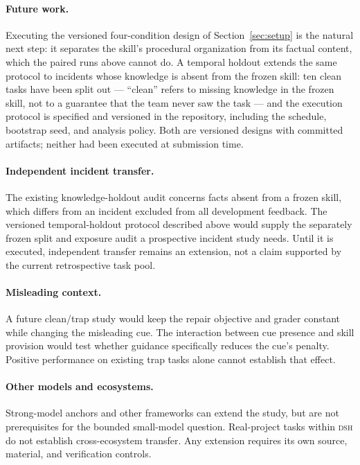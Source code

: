 \documentclass[11pt]{article}
\newcommand{\framework}{\textsc{dsh}}
\begin{document}
\paragraph{Future work.}
Executing the versioned four-condition design of Section~\ref{sec:setup} is the natural next step: it separates the skill's procedural organization from its factual content, which the paired runs above cannot do.
A temporal holdout extends the same protocol to incidents whose knowledge is absent from the frozen skill: ten clean tasks have been split out --- ``clean'' refers to missing knowledge in the frozen skill, not to a guarantee that the team never saw the task --- and the execution protocol is specified and versioned in the repository, including the schedule, bootstrap seed, and analysis policy.
Both are versioned designs with committed artifacts; neither had been executed at submission time.

\paragraph{Independent incident transfer.}
\label{sec:holdout}
The existing knowledge-holdout audit concerns facts absent from a frozen skill, which differs from an incident excluded from all development feedback.
The versioned temporal-holdout protocol described above would supply the separately frozen split and exposure audit a prospective incident study needs.
Until it is executed, independent transfer remains an extension, not a claim supported by the current retrospective task pool.

\paragraph{Misleading context.}
\label{sec:misleading}
A future clean/trap study would keep the repair objective and grader constant while changing the misleading cue.
The interaction between cue presence and skill provision would test whether guidance specifically reduces the cue's penalty.
Positive performance on existing trap tasks alone cannot establish that effect.

\paragraph{Other models and ecosystems.}
\label{sec:transfer}
Strong-model anchors and other frameworks can extend the study, but are not prerequisites for the bounded small-model question.
Real-project tasks within \framework{} do not establish cross-ecosystem transfer.
Any extension requires its own source, material, and verification controls.
\end{document}
